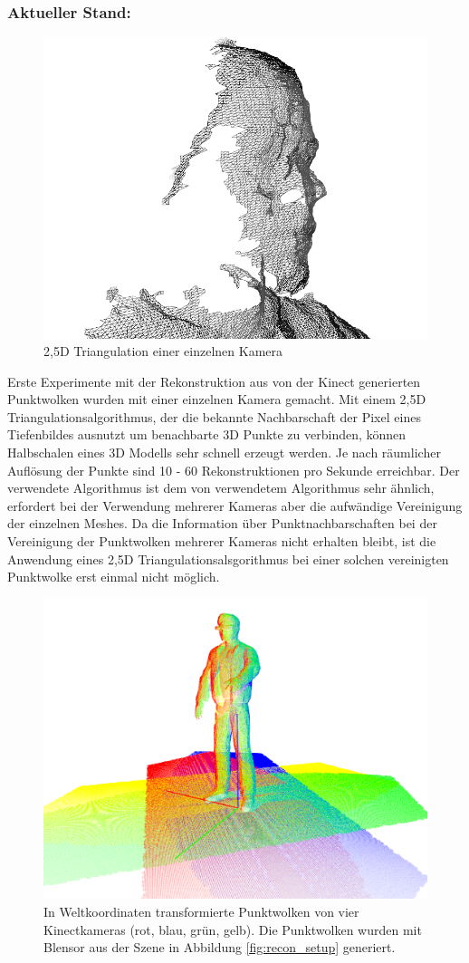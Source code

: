 \subsubsection{Aktueller Stand: }
\begin{figure}[H]
	\centering
	\includegraphics[width=.5\textwidth]{figs/recon_wireframe}
	\caption{2,5D Triangulation einer einzelnen Kamera}
	\label{fig:2dmeshed}
\end{figure}

Erste Experimente mit der Rekonstruktion aus von der 
Kinect generierten Punktwolken wurden mit einer einzelnen Kamera gemacht. Mit 
einem 2,5D Triangulationsalgorithmus, der die bekannte Nachbarschaft der Pixel 
eines Tiefenbildes ausnutzt um benachbarte 3D Punkte zu verbinden, können Halbschalen 
eines 3D Modells sehr schnell erzeugt werden. Je nach räumlicher Auflösung der 
Punkte sind 10 - 60 Rekonstruktionen pro Sekunde erreichbar. Der verwendete 
Algorithmus ist dem von \cite{alexiadis2013real} verwendetem Algorithmus sehr 
ähnlich, erfordert bei der Verwendung mehrerer Kameras aber die aufwändige 
Vereinigung der einzelnen Meshes. Da die Information über Punktnachbarschaften 
bei der Vereinigung der Punktwolken mehrerer Kameras nicht erhalten bleibt, ist 
die Anwendung eines 2,5D Triangulationsalsgorithmus bei einer solchen vereinigten 
Punktwolke erst einmal nicht möglich.

\begin{figure}[H]
	\centering
	\includegraphics[width=.5\textwidth]{figs/registered_pointclouds}
	\caption{In Weltkoordinaten transformierte Punktwolken von vier 
		Kinectkameras (rot, blau, grün, gelb). Die Punktwolken wurden mit 
		Blensor \cite{Gschwandtner11b} aus der Szene in Abbildung 
		\ref{fig:recon_setup} generiert.}
	\label{fig:cloud_sources}
\end{figure}

